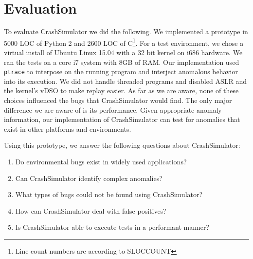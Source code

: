 \section{Evaluation}


To evaluate CrashSimulator we did the following.
We implemented a prototype in 5000 LOC of Python 2 and 2600 LOC of C\footnote{
Line count numbers are according to SLOCCOUNT}.  For a test
environment, we chose a virtual install of Ubuntu Linux 15.04 with a 32 bit kernel on i686 hardware.
We ran the tests on a core i7 system with 8GB of RAM. Our
implementation used {\tt ptrace} to interpose on the running program and
interject anomalous behavior into its execution.
We did not handle threaded programs and disabled ASLR and the kernel's vDSO to make replay
easier.  As far as we are aware, none of these choices influenced the bugs
that CrashSimulator would find.  The only major difference we are aware of 
is its performance.
Given appropriate anomaly information, our implementation of CrashSimulator can
test for anomalies that exist in other platforms and environments.  


Using this prototype, we answer the following questions about CrashSimulator:

\begin{enumerate}
   \item{Do environmental bugs exist in widely used applications?}
   \item{Can CrashSimulator identify complex anomalies?}
   \item{What types of bugs could not be found using CrashSimulator?}
   \item{How can CrashSimulator deal with false positives?}
   \item{Is CrashSimulator able to execute tests in a performant manner?}
\end{enumerate}





